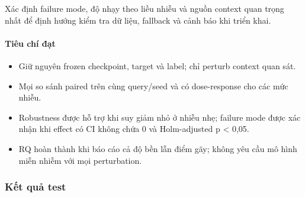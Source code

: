 Xác định failure mode, độ nhạy theo liều nhiễu và nguồn context quan trọng nhất để định hướng kiểm tra dữ liệu, fallback và cảnh báo khi triển khai.

\paragraph{Tiêu chí đạt}

\begin{itemize}
\item Giữ nguyên frozen checkpoint, target và label; chỉ perturb context quan sát.
\item Mọi so sánh paired trên cùng query/seed và có dose-response cho các mức nhiễu.
\item Robustness được hỗ trợ khi suy giảm nhỏ ở nhiễu nhẹ; failure mode được xác nhận
khi effect có CI không chứa 0 và Holm-adjusted p < 0,05.

\item RQ hoàn thành khi báo cáo cả độ bền lẫn điểm gãy; không yêu cầu mô hình miễn
nhiễm với mọi perturbation.

\end{itemize}

\subsubsection*{Kết quả test}


